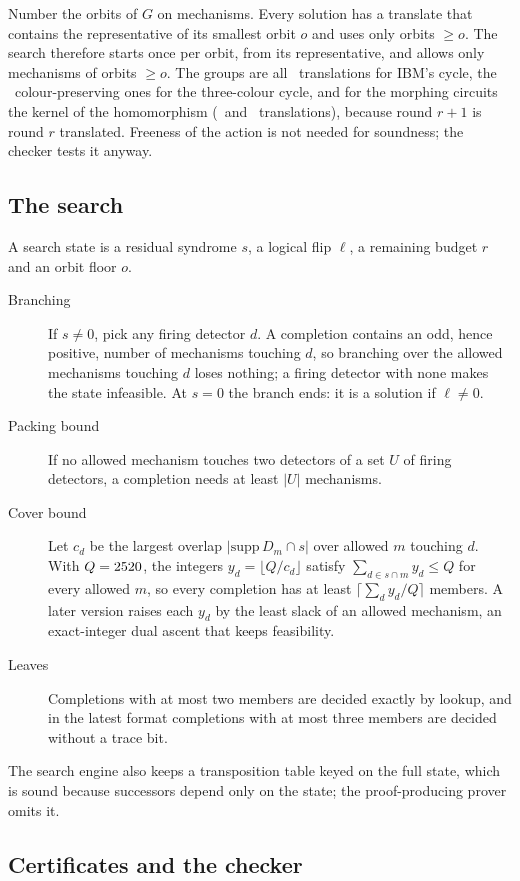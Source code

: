 \documentclass[aps,pra,twocolumn,superscriptaddress,nofootinbib,longbibliography,floatfix]{revtex4-2}
\begin{document}
Number the orbits of $G$ on mechanisms. Every solution has a translate that contains the representative of its smallest orbit $o$ and uses only orbits $\ge o$. The search therefore starts once per orbit, from its representative, and allows only mechanisms of orbits $\ge o$. The groups are all \IbmGroup\ translations for IBM's cycle, the \TcGroup\ colour-preserving ones for the three-colour cycle, and for the morphing circuits the kernel of the homomorphism (\MorphSmallGroup\ and \MorphBigGroup\ translations), because round $r+1$ is round $r$ translated. Freeness of the action is not needed for soundness; the checker tests it anyway.

\subsection{The search}

A search state is a residual syndrome $s$, a logical flip $\ell$, a remaining budget $r$ and an orbit floor $o$.
\begin{description}
\item[Branching] If $s\ne0$, pick any firing detector $d$. A completion contains an odd, hence positive, number of mechanisms touching $d$, so branching over the allowed mechanisms touching $d$ loses nothing; a firing detector with none makes the state infeasible. At $s=0$ the branch ends: it is a solution if $\ell\ne0$.
\item[Packing bound] If no allowed mechanism touches two detectors of a set $U$ of firing detectors, a completion needs at least $|U|$ mechanisms.
\item[Cover bound] Let $c_d$ be the largest overlap $|\mathrm{supp}\,D_m\cap s|$ over allowed $m$ touching $d$. With $Q=2520$, the integers $y_d=\lfloor Q/c_d\rfloor$ satisfy $\sum_{d\in s\cap m}y_d\le Q$ for every allowed $m$, so every completion has at least $\lceil\sum_d y_d/Q\rceil$ members. A later version raises each $y_d$ by the least slack of an allowed mechanism, an exact-integer dual ascent that keeps feasibility.
\item[Leaves] Completions with at most two members are decided exactly by lookup, and in the latest format completions with at most three members are decided without a trace bit.
\end{description}
The search engine also keeps a transposition table keyed on the full state, which is sound because successors depend only on the state; the proof-producing prover omits it.

\subsection{Certificates and the checker}
\end{document}
